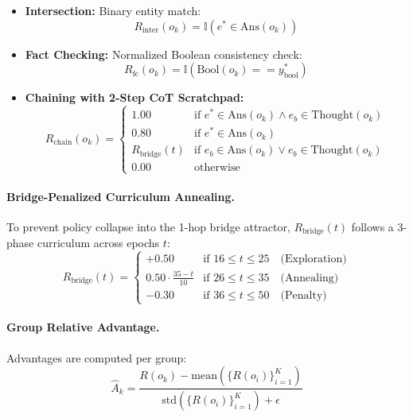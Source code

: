 \documentclass[11pt]{article}
\theoremstyle{definition}
\begin{document}
\begin{itemize}
    \item \textbf{Intersection:} Binary entity match:
    \begin{equation}
      R_{\text{inter}}(o_k) = \mathbb{I}(e^* \in \text{Ans}(o_k))
    \end{equation}
    \item \textbf{Fact Checking:} Normalized Boolean consistency check:
    \begin{equation}
      R_{\text{fc}}(o_k) = \mathbb{I}(\text{Bool}(o_k) == y_{\text{bool}}^*)
    \end{equation}
    \item \textbf{Chaining with 2-Step CoT Scratchpad:}
    \begin{equation}
      R_{\text{chain}}(o_k) = 
      \begin{cases}
        1.00 & \text{if } e^* \in \text{Ans}(o_k) \land e_b \in \text{Thought}(o_k) \\
        0.80 & \text{if } e^* \in \text{Ans}(o_k) \\
        R_{\text{bridge}}(t) & \text{if } e_b \in \text{Ans}(o_k) \lor e_b \in \text{Thought}(o_k) \\
        0.00 & \text{otherwise}
      \end{cases}
    \end{equation}
\end{itemize}

\paragraph{Bridge-Penalized Curriculum Annealing.} To prevent policy collapse into the 1-hop bridge attractor, $R_{\text{bridge}}(t)$ follows a 3-phase curriculum across epochs $t$:
\begin{equation}
  R_{\text{bridge}}(t) = 
  \begin{cases}
    +0.50 & \text{if } 16 \le t \le 25 \quad \text{(Exploration)} \\
    0.50 \cdot \frac{35 - t}{10} & \text{if } 26 \le t \le 35 \quad \text{(Annealing)} \\
    -0.30 & \text{if } 36 \le t \le 50 \quad \text{(Penalty)}
  \end{cases}
\end{equation}

\paragraph{Group Relative Advantage.} Advantages are computed per group:
\begin{equation}
  \hat{A}_k = \frac{R(o_k) - \text{mean}(\{R(o_i)\}_{i=1}^K)}{\text{std}(\{R(o_i)\}_{i=1}^K) + \epsilon}
\end{equation}
\end{document}
